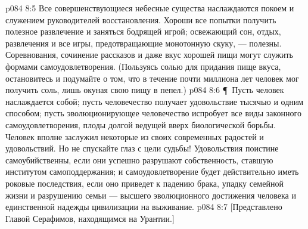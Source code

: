\vs p084 8:5 Все совершенствующиеся небесные существа наслаждаются покоем и служением руководителей восстановления. Хороши все попытки получить полезное развлечение и заняться бодрящей игрой; освежающий сон, отдых, развлечения и все игры, предотвращающие монотонную скуку, --- полезны. Соревнования, сочинение рассказов и даже вкус хорошей пищи могут служить формами самоудовлетворения. (Пользуясь солью для придания пище вкуса, остановитесь и подумайте о том, что в течение почти миллиона лет человек мог получить соль, лишь окуная свою пищу в пепел.)
\vs p084 8:6 \P\ Пусть человек наслаждается собой; пусть человечество получает удовольствие тысячью и одним способом; пусть эволюционирующее человечество испробует все виды законного самоудовлетворения, плоды долгой ведущей вверх биологической борьбы. Человек вполне заслужил некоторые из своих современных радостей и удовольствий. Но не спускайте глаз с цели судьбы! Удовольствия поистине самоубийственны, если они успешно разрушают собственность, ставшую институтом самоподдержания; и самоудовлетворение будет действительно иметь роковые последствия, если оно приведет к падению брака, упадку семейной жизни и разрушению семьи --- высшего эволюционного достижения человека и единственной надежды цивилизации на выживание.
\vs p084 8:7 [Представлено Главой Серафимов, находящимся на Урантии.]
